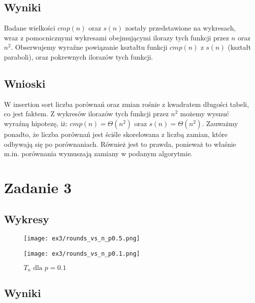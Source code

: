 \documentclass{article}
\begin{document}
\subsection{Wyniki}

Badane wielkości $cmp(n)$ oraz $s(n)$ zostały przedstawione na wykresach, wraz z pomocnicznymi wykresami obejmującymi ilorazy tych funkcji przez $n$ oraz $n^2$. Obserwujemy wyraźne powiązanie kształtu funkcji $cmp(n)$ z $s(n)$ (kształt paraboli), oraz pokrewnych ilorazów tych funkcji.


\subsection{Wnioski}

W insertion sort liczba porównań oraz zmian rośnie z kwadratem długości tabeli, co jest faktem. Z wykresów ilorazów tych funkcji przez $n^2$ możemy wysnuć wyraźną hipotezę, iż: $cmp(n)=\Theta(n^2)$ oraz $s(n)=\Theta(n^2)$. Zauważmy ponadto, że liczba porównań jest ściśle skorelowana z liczbą zamian, które odbywają się po porównaniach. Również jest to prawda, ponieważ to właśnie m.in. porównania wymuszają zamiany w podanym algorytmie.

\section{Zadanie 3}

\subsection{Wykresy}

\begin{figure}[H]
    \centering
        \begin{minipage}{0.24\textwidth}
        \centering
        \texttt{[image: ex3/rounds\_vs\_n\_p0.5.png]}
        \caption{$T_n \text{ dla } p=0.5$}
    \end{minipage}
        \begin{minipage}{0.24\textwidth}
        \centering
        \texttt{[image: ex3/rounds\_vs\_n\_p0.1.png]}
        \caption{$T_n \text{ dla } p=0.1$}
    \end{minipage}
\end{figure}

\subsection{Wyniki}
\end{document}
